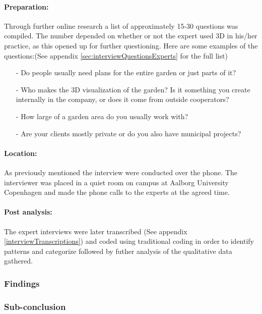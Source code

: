 		\paragraph*{Preparation:}
		Through further online research a list of approximately 15-30 questions was compiled. The number depended on whether or not the expert used 3D in his/her practice, as this opened up for further questioning. Here are some examples of the questions:(See appendix \ref{sec:interviewQuestionsExperts} for the full list)

		\begin{itemize}
			\item[-] Do people usually need plans for the entire garden or just parts of it?
			\item[-] Who makes the 3D visualization of the garden? Is it something you create internally in the company, or does it come from outside cooperators? 
			\item[-] How large of a garden area do you usually work with?
			\item[-] Are your clients mostly private or do you also have municipal projects?
		\end{itemize}
		
		\paragraph*{Location:}As previously mentioned the interview were conducted over the phone. The interviewer was placed in a quiet room on campus at Aalborg University Copenhagen and made the phone calls to the experts at the agreed time.

		\paragraph*{Post analysis:}The expert interviews were later transcribed (See appendix \ref{interviewTranscriptions}) and coded using traditional coding in order to identify patterns and categorize followed by futher analysis of the qualitative data gathered.
		
		\subsubsection{Findings}		
		
		\subsubsection{Sub-conclusion}

